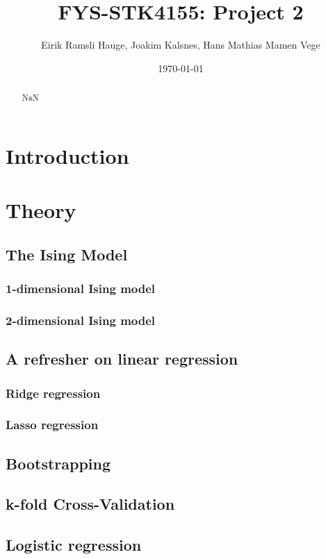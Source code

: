 \documentclass[11pt]{article}
\title{FYS-STK4155: Project 2}
\author{Eirik Ramsli Hauge, Joakim Kalsnes, Hans Mathias Mamen Vege}
\date{\today}
\begin{document}
\maketitle

\begin{abstract}
    NaN
\end{abstract}

\section{Introduction}

\section{Theory}
\subsection{The Ising Model}
\subsubsection{1-dimensional Ising model}
\subsubsection{2-dimensional Ising model}

\subsection{A refresher on linear regression}
\subsubsection{Ridge regression}
\subsubsection{Lasso regression}

\subsection{Bootstrapping}
\subsection{k-fold Cross-Validation}

\subsection{Logistic regression}
\end{document}
